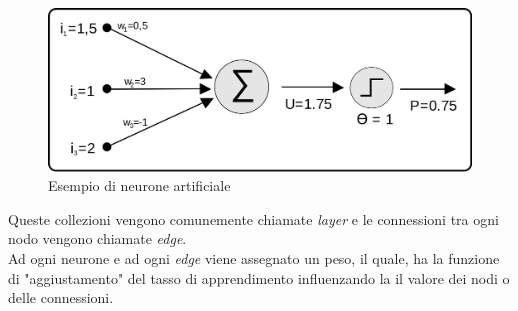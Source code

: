 \begin{figure}[H]
\centering
\includegraphics[scale=0.1]{img/neuroneArtificiale.png}
\caption{Esempio di neurone artificiale}
\end{figure}

Queste collezioni vengono comunemente chiamate \textit{layer} e le connessioni tra ogni nodo vengono chiamate \textit{edge}.\\
Ad ogni neurone e ad ogni \textit{edge} viene assegnato un peso, il quale, ha la funzione di "aggiustamento" del tasso di apprendimento influenzando la il valore dei nodi o delle connessioni.

